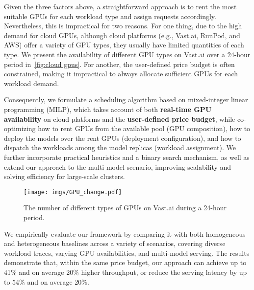 Given the three factors above, a straightforward approach is to rent the most suitable GPUs for each workload type and assign requests accordingly. 
Nevertheless, this is impractical for two reasons. 
For one thing, due to the high demand for cloud GPUs, although cloud platforms (e.g., Vast.ai, RunPod, and AWS) offer a variety of GPU types, they usually have limited quantities of each type. 
We present the availability of different GPU types on Vast.ai over a 24-hour period in~\autoref{fig:cloud gpus}. 
For another, the user-defined price budget is often constrained, making it impractical to always allocate sufficient GPUs for each workload demand. 

Consequently, we formulate a scheduling algorithm based on mixed-integer linear programming (MILP), which takes account of both \textbf{real-time GPU availability} on cloud platforms and the \textbf{user-defined price budget}, while co-optimizing how to rent GPUs from the available pool (GPU composition), how to deploy the models over the rent GPUs (deployment configuration), and how to dispatch the workloads among the model replicas (workload assignment). 
We further incorporate practical heuristics and a binary search mechanism, as well as extend our approach to the multi-model scenario, improving scalability and solving efficiency for large-scale clusters.


\begin{figure}[!t]
    \centering
    \texttt{[image: imgs/GPU\_change.pdf]}
    \caption{\small{The number of different types of GPUs on Vast.ai during a 24-hour period.}}
    \vspace{-1em}
    \label{fig:cloud gpus}
\end{figure}

We empirically evaluate our framework by comparing it with both homogeneous and heterogeneous baselines across a variety of scenarios, covering diverse workload traces, varying GPU availabilities, and multi-model serving. The results demonstrate that, within the same price budget, our approach can achieve up to 41\% and on average 20\% higher throughput, or reduce the serving latency by up to 54\% and on average 20\%.

